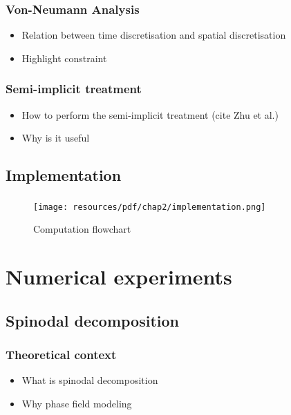         \subsubsection{Von-Neumann Analysis}
        \begin{itemize}
            \item Relation between time discretisation and spatial discretisation
            \item Highlight constraint
        \end{itemize}
        \subsubsection{Semi-implicit treatment}
        \begin{itemize}
            \item How to perform the semi-implicit treatment (cite Zhu et al.)
            \item Why is it useful
        \end{itemize}
    \subsection{Implementation}
        \subsubsection{}
        \begin{figure}[H]
            \centering
            \texttt{[image: resources/pdf/chap2/implementation.png]}
            \caption{Computation flowchart}
            \label{fig:enter-label}
        \end{figure}
\section{Numerical experiments}
    \subsection{Spinodal decomposition}
        \subsubsection{Theoretical context}
        \begin{itemize}
            \item What is spinodal decomposition
            \item Why phase field modeling
        \end{itemize}

